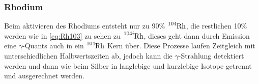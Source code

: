 \subsubsection{Rhodium}

\noindent Beim aktivieren des Rhodiums entsteht nur zu 90\% $\ce{^{104}\text{Rh}}$, die restlichen 10\% werden wie in \ref{eq:Rh103} zu sehen
zu $\ce{^{104i}\text{Rh}}$, dieses geht dann durch Emission eine $\gamma$-Quants auch in ein $\ce{^{104}\text{Rh}}$ Kern über. Diese Prozesse 
laufen Zeitgleich mit unterschiedlichen Halbwertszeiten ab, jedoch kann die $\gamma$-Strahlung detektiert werden und dann wie beim Silber in 
langlebige und kurzlebige Isotope getrennt und ausgerechnet werden. 



%
%
